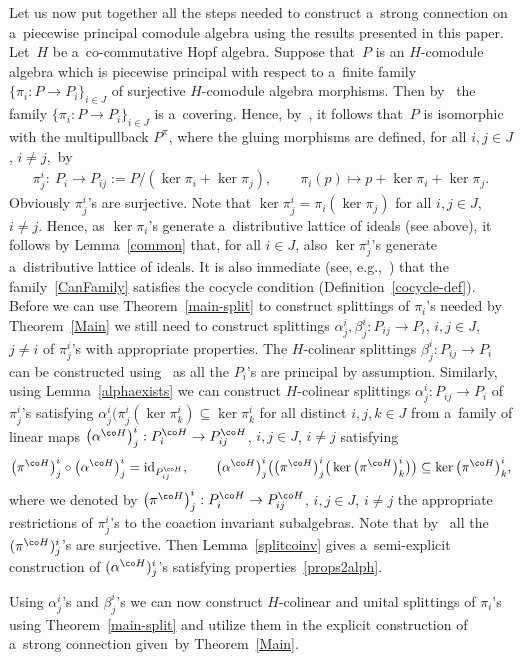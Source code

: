Let us now put together all the steps needed to construct a~strong connection on a~piecewise principal comodule algebra
using the results presented in this paper.
Let~$H$ be a~co-commutative Hopf algebra.
Suppose that~$P$ is an $H$-comodule algebra which is piecewise principal with respect to a~f\/inite family
$\{\pi_i:P\rightarrow P_i\}_{i\in J}$ of surjective $H$-comodule algebra morphisms.
Then by~\cite[Corollary~3.7]{hkmz11} the family $\{\pi_i:P\rightarrow P_i\}_{i\in J}$ is a~covering.
Hence, by~\cite[Proposition~3]{CM2000}, it follows that~$P$ is isomorphic with the multipullback $P^\pi$, where the
gluing morphisms are def\/ined, for all $i,j\in J$, $i\neq j$,~by
\begin{gather}
\label{CanFamily}
\pi^i_j: \ P_i\longrightarrow P_{ij}:=P/(\ker\pi_i+\ker\pi_j),
\qquad
\pi_i(p)\longmapsto p+\ker\pi_i+\ker\pi_j.
\end{gather}
Obviously $\pi^i_j$'s are surjective.
Note that $\ker\pi^i_j=\pi_i(\ker\pi_j)$ for all $i,j\in J$, $i\neq j$.
Hence, as $\ker\pi_i$'s generate a~distributive lattice of ideals (see above), it follows by Lemma~\ref{common} that,
for all $i\in J$, also $\ker\pi^i_j$'s generate a~distributive lattice of ideals.
It is also immediate (see, e.g.,~\cite[Remark~2]{CM2000}) that the family~\eqref{CanFamily} satisf\/ies the cocycle
condition (Def\/inition~\ref{cocycle-def}).
Before we can use Theorem~\ref{main-split} to construct splittings of $\pi_i$'s needed by Theorem~\ref{Main} we still
need to construct splittings $\alpha^i_j,\beta^i_j:P_{ij}\rightarrow P_i$, $i,j\in J$,
$j\neq i$ of $\pi^i_j$'s with appropriate properties.
The $H$-colinear splittings $\beta^i_j:P_{ij}\rightarrow P_i$ can be constructed using~\cite[Lemma~3.1]{hkmz11} as all
the $P_{i}$'s are principal by assumption.
Similarly, using Lemma~\ref{alphaexists} we can construct $H$-colinear splittings $\alpha^i_j:P_{ij}\rightarrow P_i$ of
$\pi^i_j$'s satisfying $\alpha^i_j(\pi^i_j(\ker{}\pi^i_k)\subseteq\ker\pi^i_k$ for all distinct $i,j,k\in J$ from
a~family of linear maps $\big(\alpha^{\co H}\big)^i_j:P_i^{\co H}\rightarrow P_{ij}^{\co H}$, $i,j\in J$, $i\neq j$ satisfying
\begin{gather}
\label{props2alph}
\big(\pi^{\co H}\big)^i_j\circ\big(\alpha^{\co H}\big)^i_j=\mathrm{id}_{P_{ij}^{\co H}},
\qquad
\big(\alpha^{\co H}\big)^i_j\big(\big(\pi^{\co H}\big)^i_j\big(\ker\big(\pi^{\co H}\big)^i_k\big)\big)\subseteq\ker\big(\pi^{\co H}\big)^i_k,
\end{gather}
where we denoted by $\big(\pi^{\co H}\big)^i_j:P_i^{\co H}\rightarrow P_{ij}^{\co H}$, $i,j\in J$, $i\neq j$
the appropriate restrictions of $\pi^i_j$'s to the coaction invariant subalgebras.
Note that by~\cite[Lemma~3.1]{hkmz11} all the $(\pi^{\co H})^i_j$'s are surjective.
Then Lemma~\ref{splitcoinv} gives a~semi-explicit construction of $(\alpha^{\co H})^i_j$'s satisfying properties~\eqref{props2alph}.

Using $\alpha^i_j$'s and $\beta^i_j$'s we can now construct $H$-colinear and unital splittings of $\pi_i$'s using
Theo\-rem~\ref{main-split} and utilize them in the explicit construction of a~strong connection given~by
Theorem~\ref{Main}.
